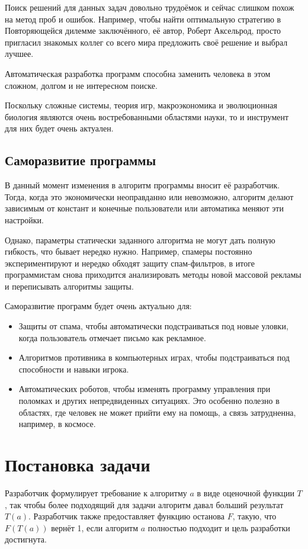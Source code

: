 \documentclass[a4paper,14pt]{extarticle}
\begin{document}
Поиск решений для данных задач довольно трудоёмок и сейчас слишком похож на
метод проб и ошибок. Например, чтобы найти оптимальную стратегию в Повторяющейся
дилемме заключённого, её автор, Роберт Аксельрод, просто пригласил знакомых
коллег со всего мира предложить своё решение и выбрал лучшее.

Автоматическая разработка программ способна заменить человека в этом сложном,
долгом и не интересном поиске.

Поскольку сложные системы, теория игр, макроэкономика и эволюционная биология
являются очень востребованными областями науки, то и инструмент для них будет
очень актуален.

\subsection{Саморазвитие программы}
В данный момент изменения в алгоритм программы вносит её разработчик. Тогда,
когда это экономически неоправданно или невозможно, алгоритм делают зависимым
от констант и конечные пользователи или автоматика меняют эти настройки.

Однако, параметры статически заданного алгоритма не могут дать полную гибкость,
что бывает нередко нужно. Например, спамеры постоянно экспериментируют и нередко
обходят защиту спам-фильтров, в итоге программистам снова приходится
анализировать методы новой массовой рекламы и переписывать алгоритмы защиты.

Саморазвитие программ будет очень актуально для:
\begin{itemize}
  \item Защиты от спама, чтобы автоматически подстраиваться под новые уловки,
        когда пользователь отмечает письмо как рекламное.
  \item Алгоритмов противника в компьютерных играх, чтобы подстраиваться под
        способности и навыки игрока.
  \item Автоматических роботов, чтобы изменять программу управления при
        поломках и других непредвиденных ситуациях. Это особенно полезно в
        областях, где человек не может прийти ему на помощь, а связь
        затрудненна, например, в космосе.
\end{itemize}

\newpage
\section{Постановка задачи}
Разработчик формулирует требование к алгоритму $a$ в виде оценочной
функции $T$, так чтобы более подходящий для задачи алгоритм давал больший
результат $T(a)$. Разработчик также предоставляет функцию останова $F$, такую,
что $F(T(a))$ вернёт 1, если алгоритм $a$ полностью подходит и цель разработки
достигнута.
\end{document}
